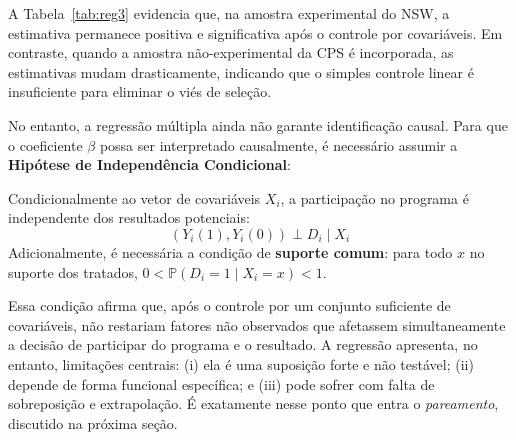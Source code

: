\documentclass[12pt,a4paper]{article}
\begin{document}
A Tabela~\ref{tab:reg3} evidencia que, na amostra experimental do NSW, a estimativa permanece positiva e significativa após o controle por covariáveis. Em contraste, quando a amostra não-experimental da CPS é incorporada, as estimativas mudam drasticamente, indicando que o simples controle linear é insuficiente para eliminar o viés de seleção.

No entanto, a regressão múltipla ainda não garante identificação causal. Para que o coeficiente $\beta$ possa ser interpretado causalmente, é necessário assumir a \textbf{Hipótese de Independência Condicional}:

\begin{hipotesebox}
Condicionalmente ao vetor de covariáveis $X_i$, a participação no programa é independente dos resultados potenciais:
$$(Y_i(1), Y_i(0)) \perp D_i \mid X_i$$
Adicionalmente, é necessária a condição de \textbf{suporte comum}: para todo $x$ no suporte dos tratados, $0 < \mathbb{P}(D_i = 1 \mid X_i = x) < 1$.
\end{hipotesebox}

Essa condição afirma que, após o controle por um conjunto suficiente de covariáveis, não restariam fatores não observados que afetassem simultaneamente a decisão de participar do programa e o resultado. A regressão apresenta, no entanto, limitações centrais: (i) ela é uma suposição forte e não testável; (ii) depende de forma funcional específica; e (iii) pode sofrer com falta de sobreposição e extrapolação. É exatamente nesse ponto que entra o \textit{pareamento}, discutido na próxima seção.
\end{document}
